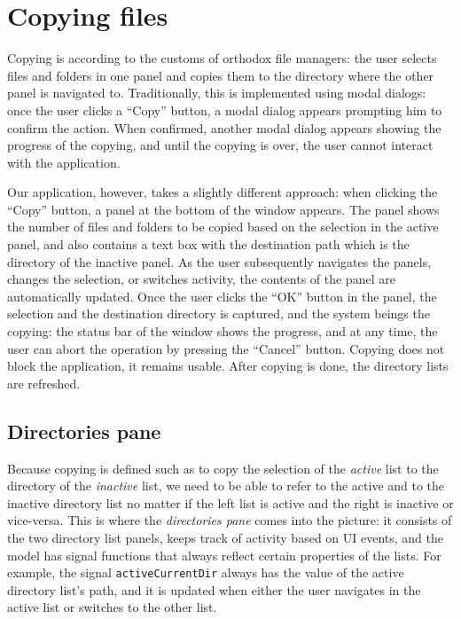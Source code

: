 \section{Copying files}

Copying is according to the customs of orthodox file managers: the user selects files and folders in one panel and copies them to the directory where the other panel is navigated to. Traditionally, this is implemented using modal dialogs: once the user clicks a ``Copy'' button, a modal dialog appears prompting him to confirm the action. When confirmed, another modal dialog appears showing the progress of the copying, and until the copying is over, the user cannot interact with the application. 

Our application, however, takes a slightly different approach: when clicking the ``Copy'' button, a panel at the bottom of the window appears. The panel shows the number of files and folders to be copied based on the selection in the active panel, and also contains a text box with the destination path which is the directory of the inactive panel. As the user subsequently navigates the panels, changes the selection, or switches activity, the contents of the panel are automatically updated. Once the user clicks the ``OK'' button in the panel, the selection and the destination directory is captured, and the system beings the copying: the status bar of the window shows the progress, and at any time, the user can abort the operation by pressing the ``Cancel'' button. Copying does not block the application, it remains usable. After copying is done, the directory lists are refreshed.

\subsection{Directories pane}

Because copying is defined such as to copy the selection of the \emph{active} list to the directory of the \emph{inactive} list, we need to be able to refer to the active and to the inactive directory list no matter if the left list is active and the right is inactive or vice-versa. This is where the \emph{directories pane} comes into the picture: it consists of the two directory list panels, keeps track of activity based on UI events, and the model has signal functions that always reflect certain properties of the lists. For example, the signal \texttt{activeCurrentDir} always has the value of the active directory list's path, and it is updated when either the user navigates in the active list or switches to the other list.

